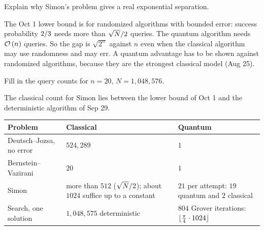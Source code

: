 \begin{exercisebox}
\begin{pproblem}\label{pp:simon-sep}
    Explain why Simon's problem gives a real exponential separation.
\end{pproblem}
\tcblower
\begin{wsolution}
    The Oct 1 lower bound is for randomized algorithms with bounded error: success probability
    $2/3$ needs more than $\sqrt{N}/2$ queries. The quantum algorithm needs
    $\mathcal{O}\left(n\right)$ queries. So the gap is $\sqrt{2^n}$ against $n$ even when the classical algorithm may
    use randomness and may err. A quantum advantage has to be shown against randomized algorithms,
    because they are the strongest classical model (Aug 25).
\end{wsolution}
\end{exercisebox}

\needspace{7cm}
\begin{exercisebox}
\begin{pproblem}[The numbers for $n = 20$]\label{pp:n20}
    Fill in the query counts for $n = 20$, $N = 1{,}048{,}576$.
\end{pproblem}
\tcblower
\begin{wsolution}
    The classical count for Simon lies between the lower bound of Oct 1 and the deterministic
    algorithm of Sep 29.
    \begin{center}
        \begin{tabular}{lp{4.4cm}p{4.4cm}}
            \toprule
            Problem                   & Classical                                                                         & Quantum                                                         \\ \midrule
            Deutsch--Jozsa, no error  & $524{,}289$                                                                       & $1$                                                             \\
            Bernstein--Vazirani       & $20$                                                                              & $1$                                                             \\
            Simon                     & more than $512$ ($\sqrt{N}/2$); about $1024$ suffice up to a constant    & $21$ per attempt: $19$ quantum and $2$ classical                \\
            Search, one solution      & $1{,}048{,}575$ deterministic                                                     & $804$ Grover iterations: $\floor{\frac{\pi}{4} \cdot 1024}$     \\ \bottomrule
        \end{tabular}
    \end{center}
\end{wsolution}
\end{exercisebox}

